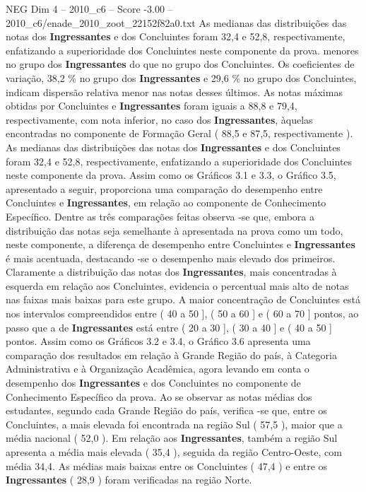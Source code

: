\begin{textsample}{NEG Dim 4 – 2010\_c6 – Score -3.00 – 2010\_c6/enade\_2010\_zoot\_22152f82a0.txt}
As medianas das distribuições das notas dos \textbf{Ingressantes} e dos Concluintes foram 32,4 e 52,8, respectivamente, enfatizando a superioridade dos Concluintes neste componente da prova. menores no grupo dos \textbf{Ingressantes} do que no grupo dos Concluintes.
Os coeficientes de variação, 38,2 \% no grupo dos \textbf{Ingressantes} e 29,6 \% no grupo dos Concluintes, indicam dispersão relativa menor nas notas desses últimos.
As notas máximas obtidas por Concluintes e \textbf{Ingressantes} foram iguais a 88,8 e 79,4, respectivamente, com nota inferior, no caso dos \textbf{Ingressantes}, àquelas encontradas no componente de Formação Geral ( 88,5 e 87,5, respectivamente ).
As medianas das distribuições das notas dos \textbf{Ingressantes} e dos Concluintes foram 32,4 e 52,8, respectivamente, enfatizando a superioridade dos Concluintes neste componente da prova.
Assim como os Gráficos 3.1 e 3.3, o Gráfico 3.5, apresentado a seguir, proporciona uma comparação do desempenho entre Concluintes e \textbf{Ingressantes}, em relação ao componente de Conhecimento Específico.
Dentre as três comparações feitas observa -se que, embora a distribuição das notas seja semelhante à apresentada na prova como um todo, neste componente, a diferença de desempenho entre Concluintes e \textbf{Ingressantes} é mais acentuada, destacando -se o desempenho mais elevado dos primeiros.
Claramente a distribuição das notas dos \textbf{Ingressantes}, mais concentradas à esquerda em relação aos Concluintes, evidencia o percentual mais alto de notas nas faixas mais baixas para este grupo.
A maior concentração de Concluintes está nos intervalos compreendidos entre ( 40 a 50 ], ( 50 a 60 ] e ( 60 a 70 ] pontos, ao passo que a de \textbf{Ingressantes} está entre ( 20 a 30 ], ( 30 a 40 ] e ( 40 a 50 ] pontos.
Assim como os Gráficos 3.2 e 3.4, o Gráfico 3.6 apresenta uma comparação dos resultados em relação à Grande Região do país, à Categoria Administrativa e à Organização Acadêmica, agora levando em conta o desempenho dos \textbf{Ingressantes} e dos Concluintes no componente de Conhecimento Específico da prova.
Ao se observar as notas médias dos estudantes, segundo cada Grande Região do país, verifica -se que, entre os Concluintes, a mais elevada foi encontrada na região Sul ( 57,5 ), maior que a média nacional ( 52,0 ).
Em relação aos \textbf{Ingressantes}, também a região Sul apresenta a média mais elevada ( 35,4 ), seguida da região Centro-Oeste, com média 34,4.
As médias mais baixas entre os Concluintes ( 47,4 ) e entre os \textbf{Ingressantes} ( 28,9 ) foram verificadas na região Norte.

\end{textsample}
